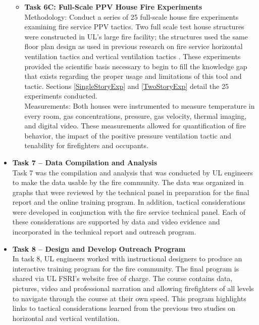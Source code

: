\documentclass{article}
\begin{document}
\begin{itemize}
\begin{itemize}
		\item \textbf{Task 6C: Full-Scale PPV House Fire Experiments} \\
		Methodology: Conduct a series of 25 full-scale house fire experiments examining fire service PPV tactics. Two full scale test house structures were constructed in UL’s large fire facility; the structures used the same floor plan design as used in previous research on fire service horizontal ventilation tactics \cite{DHS2008} and vertical ventilation tactics \cite{DHS2010}. These experiments provided the scientific basis necessary to begin to fill the knowledge gap that exists regarding the proper usage and limitations of this tool and tactic. Sections \ref{SingleStoryExp} and \ref{TwoStoryExp} detail the 25 experiments conducted.\\
		\vspace*{\baselineskip}
		Measurements: Both houses were instrumented to measure temperature in every room, gas concentrations, pressure, gas velocity, thermal imaging, and digital video. These measurements allowed for quantification of fire behavior, the impact of the positive pressure ventilation tactic and tenability for firefighters and occupants.
	\end{itemize}
	\item \textbf{Task 7 – Data Compilation and Analysis} \\
	Task 7 was the compilation and analysis that was conducted by UL engineers to make the data usable by the fire community. The data was organized in graphs that were reviewed by the technical panel in preparation for the final report and the online training program. In addition, tactical considerations were developed in conjunction with the fire service technical panel. Each of these considerations are supported by data and video evidence and incorporated in the technical report and outreach program.
	
	\item \textbf{Task 8 – Design and Develop Outreach Program} \\
	In task 8, UL engineers worked with instructional designers to produce an interactive training program for the fire community. The final program is shared via UL FSRI's website free of charge.  The course contains data, pictures, video and professional narration and allowing firefighters of all levels to navigate through the course at their own speed. This program highlights links to tactical considerations learned from the previous two studies on horizontal and vertical ventilation.
	

\end{itemize}
\end{document}

